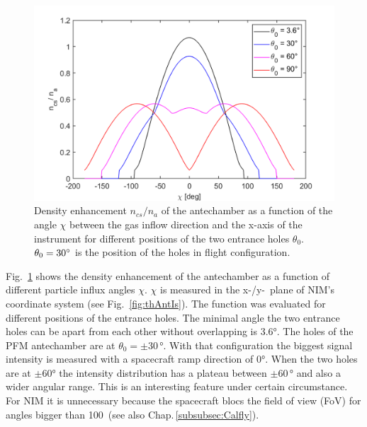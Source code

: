 	\begin{figure}[h!] %
		\centering
		\includegraphics[width= .8\textwidth]{Bilder/Chi_theta0.png}
		\caption{Density enhancement $n_{cs}/n_a$ of the antechamber as a function of the angle $\chi$ between the gas inflow direction and the x-axis of the instrument for different positions of the two entrance holes $\theta_0$. $\theta_0=30^\circ$ is the position of the holes in flight configuration.}
		\label{th:densEnhChiTheta}
	\end{figure}
	Fig.~\ref{th:densEnhChiTheta} shows the density enhancement of the antechamber as a function of different particle influx angles $\chi$. $\chi$ is measured in the x-/y-~plane of NIM's coordinate system (see Fig.~\ref{fig:thAntIs}). The function was evaluated for different positions of the entrance holes. The minimal angle the two entrance holes can be apart from each other without overlapping is 3.6\si{\degree}. The holes of the PFM antechamber are at $\theta_0 = \pm30\,\si{\degree}$. With that configuration the biggest signal intensity is measured with a spacecraft ramp direction of 0\si{\degree}. When the two holes are at $\pm$60\si{\degree} the intensity distribution has a plateau between $\pm$60\,\si{\degree} and also a wider angular range. This is an interesting feature under certain circumstance. For NIM it is unnecessary because the spacecraft blocs the field of view (FoV) for angles bigger than 100\degree~(see also Chap.\,\ref{subsubsec:Calfly}).
	\newpage
	
